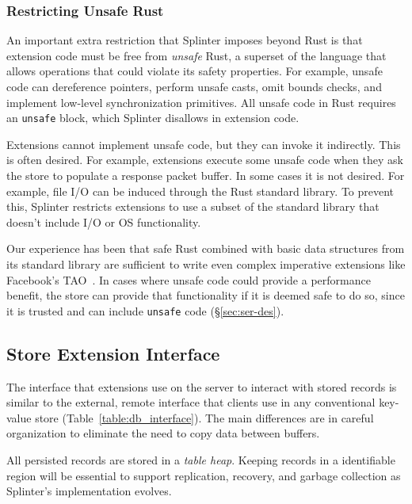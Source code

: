 \subsubsection{Restricting Unsafe Rust}
\label{sec:unsafe}

An important extra restriction that Splinter imposes beyond Rust is that
  extension code must be free from \emph{unsafe} Rust, a superset of the
  language that allows
  operations that could violate its safety properties.
For example, unsafe code can dereference pointers, perform unsafe casts, omit
  bounds checks, and implement low-level synchronization primitives.
All unsafe code in Rust requires an \texttt{unsafe} block, which
Splinter disallows in extension code.

Extensions cannot implement unsafe code, but they can invoke it indirectly.
This is often desired.
For example, extensions execute some unsafe code when they ask the store to
  populate a response packet buffer.
In some cases it is not desired.
For example, file I/O can be induced through the Rust standard
  library.
To prevent this, Splinter restricts extensions to use a subset of the standard
  library that doesn't include I/O or OS functionality.

Our experience has been that safe Rust combined with basic data structures from
  its standard library are sufficient to write even complex imperative extensions
  like Facebook's TAO~\cite{tao-2013}.
In cases where unsafe code could provide a performance benefit, the store can
  provide that functionality if it is deemed safe to do so, since it is trusted
  and can include \texttt{unsafe} code (\S\ref{sec:ser-des}).

\subsection{Store Extension Interface}
\label{sec:db-iface}

The interface that extensions use on the server to interact with stored records is similar to
  the external, remote interface that clients use in any conventional key-value
  store (Table~\ref{table:db_interface}).
The main differences are in careful organization to eliminate the need to copy
  data between buffers.

All persisted records are stored in a \emph{table heap}.
Keeping records in a identifiable region will be essential to support
  replication, recovery, and garbage collection as Splinter's implementation
  evolves.

